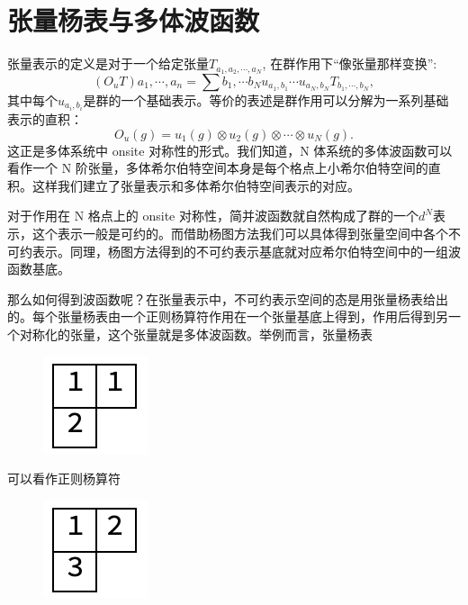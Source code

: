 \documentclass[UTF8]{ctexart}
\begin{document}
\section*{张量杨表与多体波函数}
\noindent 张量表示的定义是对于一个给定张量$T_{a_1,a_2,\cdots,a_N}$, 在群作用下“像张量那样变换”:
\begin{equation}
	(O_uT){a_1,\cdots,a_n} = \sum{b_1,\cdots b_N} u_{a_1,b_1}\cdots u_{a_N,b_N} T_{b_1,\cdots,b_N}, 
\end{equation}
其中每个$u_{a_i,b_i}$是群的一个基础表示。等价的表述是群作用可以分解为一系列基础表示的直积：
\begin{equation}
	O_u(g) = u_1(g)\otimes u_2(g) \otimes \cdots \otimes u_N(g).
\end{equation}
这正是多体系统中 onsite 对称性的形式。我们知道，N 体系统的多体波函数可以看作一个 N 阶张量，多体希尔伯特空间本身是每个格点上小希尔伯特空间的直积。这样我们建立了张量表示和多体希尔伯特空间表示的对应。

对于作用在 N 格点上的 onsite 对称性，简并波函数就自然构成了群的一个$d^N$表示，这个表示一般是可约的。而借助杨图方法我们可以具体得到张量空间中各个不可约表示。同理，杨图方法得到的不可约表示基底就对应希尔伯特空间中的一组波函数基底。

那么如何得到波函数呢？在张量表示中，不可约表示空间的态是用张量杨表给出的。每个张量杨表由一个正则杨算符作用在一个张量基底上得到，作用后得到另一个对称化的张量，这个张量就是多体波函数。举例而言，张量杨表

\begin{figure}[H]
\begin{centering}
\includegraphics[width=.1\linewidth]{include/Y1}
\par\end{centering}
\end{figure}

\noindent 可以看作正则杨算符

\begin{figure}[H]
\begin{centering}
\includegraphics[width=.1\linewidth]{include/Y2}
\par\end{centering}
\end{figure}
\end{document}
